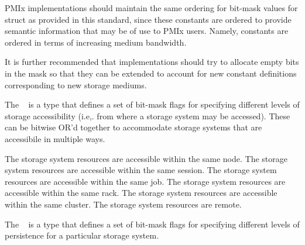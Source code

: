 \adviceimplstart
PMIx implementations should maintain the same ordering for bit-mask values for  struct as provided in this standard, since these constants are ordered to provide semantic information that may be of use to PMIx users. Namely,  constants are ordered in terms of increasing medium bandwidth.

It is further recommended that implementations should try to allocate empty bits in the mask so that they can be extended to account for new constant definitions corresponding to new storage mediums.
\adviceimplend


The ~\provisionalMarker{} is a  type that defines a set of bit-mask flags for specifying different levels of storage accessibility (i.e,. from where a storage system may be accessed). These can be bitwise OR'd together to accommodate storage systems that are accessibile in multiple ways.

\begin{constantdesc}
%
The storage system resources are accessible within the same node.
%
The storage system resources are accessible within the same session.
%
The storage system resources are accessible within the same job.
%
The storage system resources are accessible within the same rack.
%
The storage system resources are accessible within the same cluster.
%
The storage system resources are remote.
%
\end{constantdesc}


The ~\provisionalMarker{} is a  type that defines a set of bit-mask flags for specifying different levels of persistence for a particular storage system.

